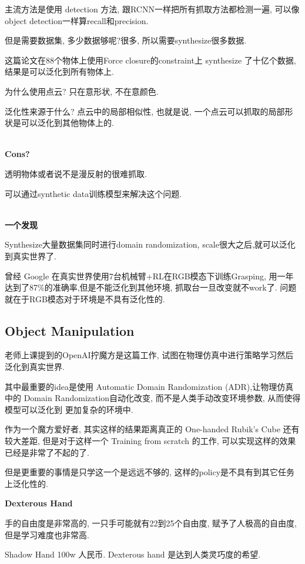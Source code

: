 主流方法是使用 detection 方法, 跟RCNN一样把所有抓取方法都检测一遍, 
可以像object detection一样算recall和precision.

但是需要数据集, 多少数据够呢?很多, 所以需要synthesize很多数据.

这篇论文\cite{fang2020graspnet}在88个物体上使用Force closure的constraint上
synthesize 了十亿个数据,结果是可以泛化到所有物体上.

为什么使用点云? 只在意形状, 不在意颜色.

泛化性来源于什么? 点云中的局部相似性, 也就是说, 一个点云可以抓取的局部形状是可以泛化到其他物体上的.

\textbf{\\Cons?}

透明物体或者说不是漫反射的很难抓取.

可以通过synthetic data训练模型来解决这个问题.

\textbf{\\一个发现}

Synthesize大量数据集同时进行domain randomization, scale很大之后,就可以泛化到真实世界了.

曾经 Google 在真实世界使用7台机械臂+RL在RGB模态下训练Grasping, 
用一年达到了87\%的准确率,但是不能泛化到其他环境, 抓取台一旦改变就不work了.
问题就在于RGB模态对于环境是不具有泛化性的.

\subsection{Object Manipulation}

老师上课提到的OpenAI拧魔方是这篇工作\cite{openai2019solving}, 
试图在物理仿真中进行策略学习然后泛化到真实世界.

其中最重要的idea是使用 Automatic Domain Randomization (ADR),让物理仿真中的
Domain Randomization自动化改变, 而不是人类手动改变环境参数, 从而使得模型可以泛化到
更加复杂的环境中.

作为一个魔方爱好者, 其实这样的结果距离真正的 One-handed Rubik's Cube
还有较大差距, 但是对于这样一个 Training from scratch 的工作, 可以实现这样的效果已经是非常了不起的了.

但是更重要的事情是只学这一个是远远不够的, 这样的policy是不具有到其它任务上泛化性的.

\textbf{Dexterous Hand}

手的自由度是非常高的, 一只手可能就有22到25个自由度, 赋予了人极高的自由度, 但是学习难度也非常高.

Shadow Hand 100w 人民币. Dexterous hand 是达到人类灵巧度的希望.

